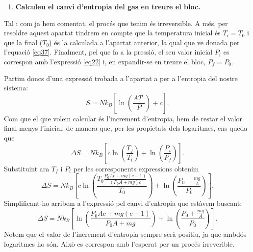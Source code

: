 \documentclass[a4paper, 10pt]{article}
\begin{document}
\begin{enumerate}[leftmargin=0pt,label=\arabic*.,labelsep=0.5em,before=\setlength{\parindent}{0pt}]
	Per determinar la temperatura final, substituïm l'expressió trobada de $h_f$ \eqref{eqhf} en l’expressió anterior de $T$ \eqref{eqT}
	\begin{equation}
		T 
		= 
		\frac{P_0 A}{nR} h 
		\left( 1 + \frac{mg(c-1)}{P_0 A c} \right)
		=
		\frac{h}{nRC}
		\left( P_0 A c + mg(c-1) \right)
	\end{equation}
	Ara tornem a substituir el nombre de mols \eqref{eqn}
	\begin{equation}
		T 
		= 
		\frac{h R T_0}{Rc (P_0 + \frac{mg}{A})hA}
		\left( P_0 A c + mg(c-1) \right)
		=
		T_0
		\frac{P_0 A c + mg(c-1)}{c(P_0 A + mg)}
	\end{equation}
	Finalment, simplificant l’expressió, s’obté
	\begin{equation}
		\boxed{T = T_0 \left( 1 - \frac{mg}{c(P_0 A + mg)} \right)}.
	\label{eq37}
	\end{equation}
	En aquesta expressió podem veure que $T < T_0$. És coherent ja que, en expandir-se el gas sense transferència de calor, la seva energia interna es reparteix sobre un volum major, fet que fa que la temperatura final sigui menor que la inicial.
	
	\item \textbf{Calculeu el canvi d'entropia del gas en treure el bloc.}
\end{enumerate}
Tal i com ja hem comentat, el procés que tenim és irreversible. A més, per resoldre aquest apartat tindrem en compte que la temperatura inicial és $T_i=T_0$ i que la final ($T_0$) és la calculada a l'apartat anterior, la qual que ve donada per l'equació \eqref{eq37}. Finalment, pel que fa a la pressió, el seu valor inicial $P_i$ es correspon amb l'expressió \eqref{eq22} i, en expandir-se en treure el bloc, $P_f=P_0$.

Partim doncs d'una expressió trobada a l'apartat a per a l'entropia del nostre sistema:
\begin{equation}
	S = Nk_B\left[\ln(\frac{AT^{c}}{P})+c\right].
\end{equation} 
Com que el que volem calcular és l'increment d'entropia, hem de restar el valor final menys l'inicial, de manera que, per les propietats dels logaritmes, ens queda que
\begin{equation*}
	\Delta S = Nk_B\left[c\ln(\frac{T_f}{T_i})+\ln(\frac{P_i}{P_f})\right].
\end{equation*}
Substituint ara $T_f$ i $P_i$ per les corresponents expressions obtenim
\begin{equation*}
	\Delta S = Nk_B\left[c\ln(\frac{T_0\frac{P_0 Ac+mg(c-1)}{(P_0A+mg)c}}{T_0})+\ln(\frac{P_0+\frac{mg}{A}}{P_0})\right].
\end{equation*}
Simplificant-ho arribem a l'expressió pel canvi d'entropia que estàvem buscant:
\begin{equation}
	\boxed{\Delta S = Nk_B\left[\ln(\frac{P_0 Ac+mg(c-1)}{P_0A+mg})+\ln(\frac{P_0+\frac{mg}{A}}{P_0})\right]}.
\end{equation}
Notem que el valor de l'increment d'entropia sempre serà positiu, ja que ambdós logaritmes ho són. Això es correspon amb l'esperat per un procés irreverible.
\end{document}
